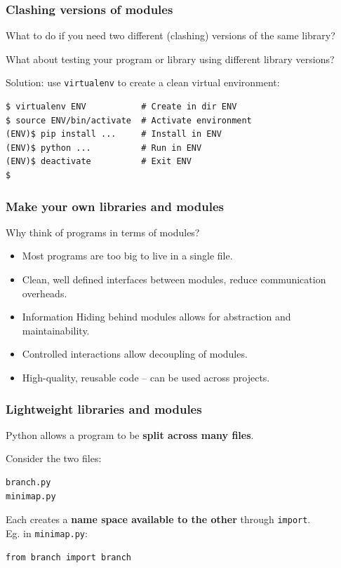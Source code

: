 \documentclass{beamer} %
\newcommand\emc[1]{\textcolor{brightblue}{\textbf{#1}}}
\begin{document}
\begin{frame}[fragile]

\frametitle{Clashing versions of modules}

What to do if you need two different (clashing) versions of the same library?

What about testing your program or library using different library versions?

\vspace{5mm}
Solution: use \texttt{virtualenv} to create a clean virtual environment:
\begin{small}
\begin{verbatim}
$ virtualenv ENV           # Create in dir ENV
$ source ENV/bin/activate  # Activate environment
(ENV)$ pip install ...     # Install in ENV
(ENV)$ python ...          # Run in ENV
(ENV)$ deactivate          # Exit ENV
$
\end{verbatim}
\end{small}

\end{frame}


\begin{frame}

\frametitle{Make your own libraries and modules}

Why think of programs in terms of modules?
\begin{itemize}
  \item Most programs are too big to live in a single file.
  \item Clean, well defined interfaces between modules, reduce communication overheads. 
  \item Information Hiding behind modules allows for abstraction and maintainability.
  \item Controlled interactions allow decoupling of modules.
  \item High-quality, reusable code -- can be used across projects.
\end{itemize}

\end{frame}

\begin{frame}[fragile]

\frametitle{Lightweight libraries and modules}

Python allows a program to be \emc{split across many files}. 

\vspace{3mm}
Consider the two files:
\begin{verbatim}
branch.py
minimap.py
\end{verbatim}

\vspace{3mm}
Each creates a \emc{name space available to the other} through \texttt{import}. \\ Eg. in \texttt{minimap.py}:
\begin{verbatim}
from branch import branch
\end{verbatim}

\end{frame}
\end{document}
